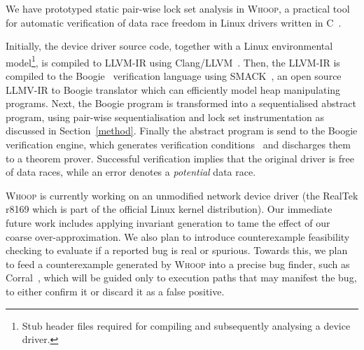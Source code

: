 We have prototyped static pair-wise lock set analysis in \textsc{Whoop}, a practical tool for automatic verification of data race freedom in Linux drivers written in C~\cite{kernighan1988c}.

Initially, the device driver source code, together with a Linux environmental model\footnote{Stub header files required for compiling and subsequently analysing a device driver.}, is compiled to LLVM-IR using Clang/LLVM~\cite{lattner2004llvm}. Then, the LLVM-IR is compiled to the Boogie~\cite{barnett2006boogie} verification language using SMACK~\cite{rakamaric2008automatic}, an open source LLMV-IR to Boogie translator which can efficiently model heap manipulating programs. Next, the Boogie program is transformed into a sequentialised abstract program, using pair-wise sequentialisation and lock set instrumentation as discussed in Section~\ref{method}. Finally the abstract program is send to the Boogie verification engine, which generates verification conditions~\cite{barnett2005weakest} and discharges them to a theorem prover. Successful verification implies that the original driver is free of data races, while an error denotes a \emph{potential} data race.

\textsc{Whoop} is currently working on an unmodified network device driver (the RealTek r8169 which is part of the official Linux kernel distribution). Our immediate future work includes applying invariant generation to tame the effect of our coarse over-approximation. We also plan to introduce counterexample feasibility checking to evaluate if a reported bug is real or spurious. Towards this, we plan to feed a counterexample generated by \textsc{Whoop} into a precise bug finder, such as Corral~\cite{lal2012corral}, which will be guided only to execution paths that may manifest the bug, to either confirm it or discard it as a false positive.
